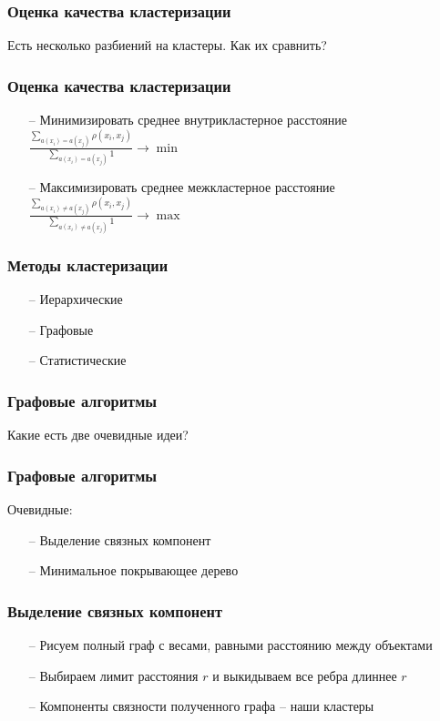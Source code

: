 \documentclass[12pt]{beamer}
\begin{document}
\begin{frame}\frametitle{Оценка качества кластеризации}
Есть несколько разбиений на кластеры. Как их сравнить?
\end{frame}

\begin{frame}\frametitle{Оценка качества кластеризации}
\begin{itemize}
\item[--] Минимизировать среднее внутрикластерное расстояние\\
\vspace{5mm}
${\frac{\sum\limits_{a(x_i) = a(x_j)} \rho(x_i, x_j)}{\sum\limits_{a(x_i) = a(x_j)} 1} \rightarrow \min}$
\item[--] Максимизировать среднее межкластерное расстояние\\
\vspace{5mm}
${\frac{\sum\limits_{a(x_i) \neq a(x_j)} \rho(x_i, x_j)}{\sum\limits_{a(x_i) \neq a(x_j)} 1} \rightarrow \max}$
\end{itemize}
\end{frame}

\begin{frame}\frametitle{Методы кластеризации}
\begin{itemize}
\item[--] Иерархические
\item[--] Графовые 
\item[--] Статистические 
\end{itemize}
\end{frame}

\begin{frame}\frametitle{Графовые алгоритмы}
Какие есть две очевидные идеи?
\end{frame}

\begin{frame}\frametitle{Графовые алгоритмы}
Очевидные:\\
\begin{itemize}
\item[--] Выделение связных компонент
\item[--] Минимальное покрывающее дерево
\end{itemize}
\end{frame}

\begin{frame}\frametitle{Выделение связных компонент}
\begin{itemize}
\item[--] Рисуем полный граф с весами, равными расстоянию между объектами
\item[--] Выбираем лимит расстояния $r$ и выкидываем все ребра длиннее $r$
\item[--] Компоненты связности полученного графа -- наши кластеры
\end{itemize}
\end{frame}
\end{document}
